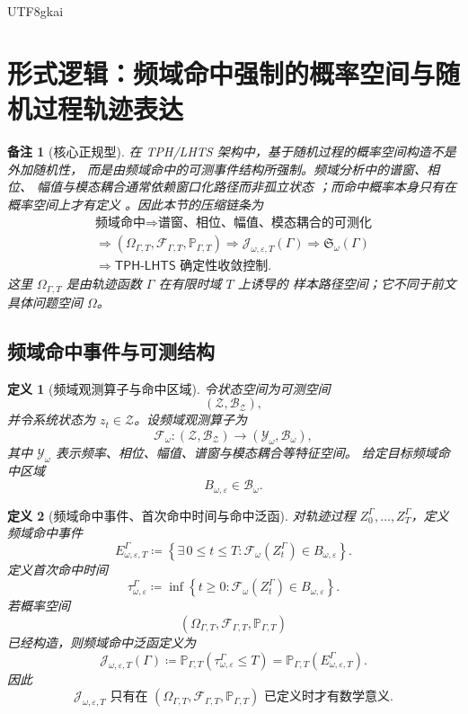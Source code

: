 \documentclass[12pt]{article}
\newtheorem{definition}{定义}[section]
\newtheorem{remark}{备注}[section]
\newcommand{\TPHLHTS}{\ensuremath{\mathsf{TPH\mbox{-}LHTS}}}
\newcommand{\DefEq}{\coloneqq}
\newcommand{\Prob}{\mathbb P}
\begin{document}
\begin{CJK*}{UTF8}{gkai}
\section{形式逻辑：频域命中强制的概率空间与随机过程轨迹表达}
\label{sec:frequency-hit-probability-space}

\begin{remark}[核心正规型]
在 TPH/LHTS 架构中，基于随机过程的概率空间构造不是外加随机性，
而是由频域命中的可测事件结构所强制。频域分析中的谱窗、相位、
幅值与模态耦合通常依赖窗口化路径而非孤立状态
\cite{OppenheimSchafer2010DSP,Mallat2009Wavelet}；而命中概率本身只有在
概率空间上才有定义 \cite{Billingsley1995Probability}。因此本节的压缩链条为
\[
\boxed{
\begin{gathered}
\text{频域命中}
\Rightarrow
\text{谱窗、相位、幅值、模态耦合的可测化}
\\
\Rightarrow
(\Omega_{\Gamma,T},\mathscr F_{\Gamma,T},\Prob_{\Gamma,T})
\Rightarrow
\mathcal J_{\omega,\varepsilon,T}(\Gamma)
\Rightarrow
\mathfrak S_\omega(\Gamma)
\\
\Rightarrow
\TPHLHTS\text{ 确定性收敛控制}.
\end{gathered}
}
\]
这里 \(\Omega_{\Gamma,T}\) 是由轨迹函数 \(\Gamma\) 在有限时域 \(T\) 上诱导的
样本路径空间；它不同于前文具体问题空间 \(\Omega\)。
\end{remark}

\subsection{频域命中事件与可测结构}
\label{subsec:frequency-hit-event}

\begin{definition}[频域观测算子与命中区域]
令状态空间为可测空间
\[
(\mathcal Z,\mathscr B_{\mathcal Z}),
\]
并令系统状态为 \(z_t\in\mathcal Z\)。设频域观测算子为
\[
\mathcal F_\omega:
(\mathcal Z,\mathscr B_{\mathcal Z})
\longrightarrow
(\mathcal Y_\omega,\mathscr B_{\omega}),
\]
其中 \(\mathcal Y_\omega\) 表示频率、相位、幅值、谱窗与模态耦合等特征空间。
给定目标频域命中区域
\[
B_{\omega,\varepsilon}\in\mathscr B_{\omega}.
\]
\end{definition}

\begin{definition}[频域命中事件、首次命中时间与命中泛函]
对轨迹过程 \(Z_0^\Gamma,\ldots,Z_T^\Gamma\)，定义频域命中事件
\[
E_{\omega,\varepsilon,T}^{\Gamma}
\DefEq
\left\{
\exists\,0\le t\le T:
\mathcal F_\omega(Z_t^\Gamma)\in B_{\omega,\varepsilon}
\right\}.
\]
定义首次命中时间
\[
\tau_{\omega,\varepsilon}^{\Gamma}
\DefEq
\inf
\left\{
t\ge0:
\mathcal F_\omega(Z_t^\Gamma)\in B_{\omega,\varepsilon}
\right\}.
\]
若概率空间
\[
(\Omega_{\Gamma,T},\mathscr F_{\Gamma,T},\Prob_{\Gamma,T})
\]
已经构造，则频域命中泛函定义为
\[
\boxed{
\mathcal J_{\omega,\varepsilon,T}(\Gamma)
\DefEq
\Prob_{\Gamma,T}
\left(
\tau_{\omega,\varepsilon}^{\Gamma}\le T
\right)
=
\Prob_{\Gamma,T}(E_{\omega,\varepsilon,T}^{\Gamma}).
}
\]
因此
\[
\boxed{
\mathcal J_{\omega,\varepsilon,T}
\text{ 只有在 }
(\Omega_{\Gamma,T},\mathscr F_{\Gamma,T},\Prob_{\Gamma,T})
\text{ 已定义时才有数学意义}.
}
\]
\end{definition}


\end{CJK*}
\end{document}
